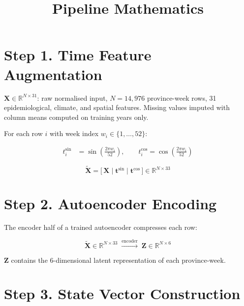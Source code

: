 \documentclass{article}
\title{Pipeline Mathematics}
\author{}
\date{}
\begin{document}
\maketitle

\section*{Step 1. Time Feature Augmentation}

$\mathbf{X} \in \mathbb{R}^{N \times 31}$: raw normalised input,
$N = 14{,}976$ province-week rows, 31 epidemiological, climate, and spatial features.
Missing values imputed with column means computed on training years only.

For each row $i$ with week index $w_i \in \{1,\ldots,52\}$:

\begin{align}
    t^{\sin}_{i} &= \sin\!\left(\tfrac{2\pi w_i}{52}\right), \qquad
    t^{\cos}_{i}  = \cos\!\left(\tfrac{2\pi w_i}{52}\right)
\end{align}

\begin{equation}
    \tilde{\mathbf{X}}
    = \bigl[\,\mathbf{X} \mid \mathbf{t}^{\sin} \mid \mathbf{t}^{\cos}\,\bigr]
    \in \mathbb{R}^{N \times 33}
\end{equation}

\section*{Step 2. Autoencoder Encoding}

The encoder half of a trained autoencoder compresses each row:

\begin{equation}
    \tilde{\mathbf{X}} \in \mathbb{R}^{N \times 33}
    \;\xrightarrow{\text{encoder}}\;
    \mathbf{Z} \in \mathbb{R}^{N \times 6}
\end{equation}

$\mathbf{Z}$ contains the 6-dimensional latent representation of each province-week.

\section*{Step 3. State Vector Construction}
\end{document}
